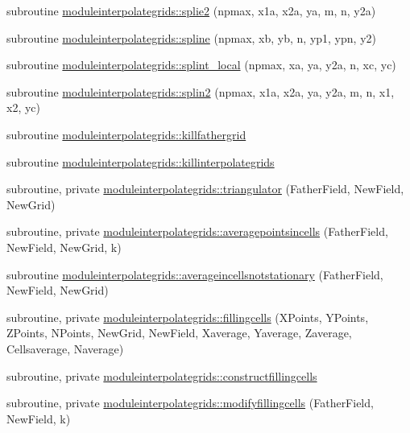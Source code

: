 \begin{DoxyCompactItemize}
\item 
subroutine \mbox{\hyperlink{namespacemoduleinterpolategrids_aaaaf0fdabdeb343cb80f4c083588e3ec}{moduleinterpolategrids\+::splie2}} (npmax, x1a, x2a, ya, m, n, y2a)
\item 
subroutine \mbox{\hyperlink{namespacemoduleinterpolategrids_ab307084ecee857465992d138cb9d22d3}{moduleinterpolategrids\+::spline}} (npmax, xb, yb, n, yp1, ypn, y2)
\item 
subroutine \mbox{\hyperlink{namespacemoduleinterpolategrids_a6c7fccee42f4e09612054b2280c92034}{moduleinterpolategrids\+::splint\+\_\+local}} (npmax, xa, ya, y2a, n, xc, yc)
\item 
subroutine \mbox{\hyperlink{namespacemoduleinterpolategrids_a3af6dc367d6a4dfa5e4250dcb85ab37f}{moduleinterpolategrids\+::splin2}} (npmax, x1a, x2a, ya, y2a, m, n, x1, x2, yc)
\item 
subroutine \mbox{\hyperlink{namespacemoduleinterpolategrids_a697db5b73722dba5d0ff54b8ac62f66a}{moduleinterpolategrids\+::killfathergrid}}
\item 
subroutine \mbox{\hyperlink{namespacemoduleinterpolategrids_a99be0febe139538023f622ad08cd5770}{moduleinterpolategrids\+::killinterpolategrids}}
\item 
subroutine, private \mbox{\hyperlink{namespacemoduleinterpolategrids_aab05b158a6c1a5ca9b834b44a96bed51}{moduleinterpolategrids\+::triangulator}} (Father\+Field, New\+Field, New\+Grid)
\item 
subroutine, private \mbox{\hyperlink{namespacemoduleinterpolategrids_a88091593ce71c7617aca77912135e4af}{moduleinterpolategrids\+::averagepointsincells}} (Father\+Field, New\+Field, New\+Grid, k)
\item 
subroutine \mbox{\hyperlink{namespacemoduleinterpolategrids_a74dfc196d632c6152816d265fcced032}{moduleinterpolategrids\+::averageincellsnotstationary}} (Father\+Field, New\+Field, New\+Grid)
\item 
subroutine, private \mbox{\hyperlink{namespacemoduleinterpolategrids_aa49617b962704e0850c47dd72be5a154}{moduleinterpolategrids\+::fillingcells}} (X\+Points, Y\+Points, Z\+Points, N\+Points, New\+Grid, New\+Field, Xaverage, Yaverage, Zaverage, Cellsaverage, Naverage)
\item 
subroutine, private \mbox{\hyperlink{namespacemoduleinterpolategrids_a3df578fd05d6020ac889661230172322}{moduleinterpolategrids\+::constructfillingcells}}
\item 
subroutine, private \mbox{\hyperlink{namespacemoduleinterpolategrids_aef67e9e027ab07c151745060a6b0e649}{moduleinterpolategrids\+::modifyfillingcells}} (Father\+Field, New\+Field, k)

\end{DoxyCompactItemize}
